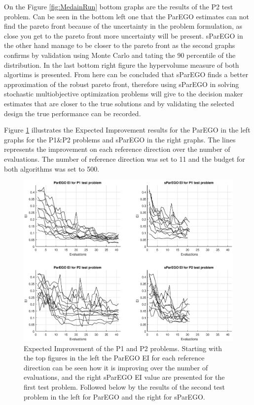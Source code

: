 \documentclass[10pt]{llncs}
\begin{document}
On the Figure \ref{fig:MedainRun} bottom graphs are the results of the P2 test problem. Can be seen in the bottom left one that the ParEGO estimates can not find the pareto front because of the uncertainty in the problem formulation, as close you get to the pareto front more uncertainty will be present. sParEGO in the other hand manage to be closer to the pareto front as the second graphs confirms by validation using Monte Carlo and tating the 90 percentile of the distribution. In the last bottom right figure the hypervolume measure of both algortims is presented. From here can be concluded that sParEGO finds a better approximation of the robust pareto front, therefore using sParEGO in solving stochastic multiobjective optimization problems will give to the decision maker estimates that are closer to the true solutions and by validating the selected design the true performance can be recorded.
    
Figure \ref{fig:EI} illustrates the Expected Improvement results for the ParEGO in the left graphs for the P1$\&$P2  problems  and sParEGO in the right graphs. The lines represents the improvement on each reference direction over the number of evaluations. The number of reference direction was set to 11 and the budget for both algorithms was set to 500. 

\begin{figure}
\begin{center}
\includegraphics[scale=0.45]{EI}
\end{center}
\caption{Expected Improvement of the P1 and P2 problems. Starting with the top figures in the left the ParEGO EI for each reference direction can be seen how it is improving over the number of evaluations, and the right sParEGO EI value are presented for the first test problem. Followed below by the results of the second test problem in the left for ParEGO and the right for sParEGO.}
\label{fig:EI}
\end{figure}
\end{document}

